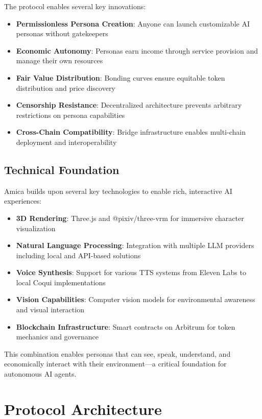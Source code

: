 \documentclass{article}
\begin{document}
The protocol enables several key innovations:

\begin{itemize}
    \item \textbf{Permissionless Persona Creation}: Anyone can launch customizable AI personas without gatekeepers
    \item \textbf{Economic Autonomy}: Personas earn income through service provision and manage their own resources
    \item \textbf{Fair Value Distribution}: Bonding curves ensure equitable token distribution and price discovery
    \item \textbf{Censorship Resistance}: Decentralized architecture prevents arbitrary restrictions on persona capabilities
    \item \textbf{Cross-Chain Compatibility}: Bridge infrastructure enables multi-chain deployment and interoperability
\end{itemize}

\subsection{Technical Foundation}

Amica builds upon several key technologies to enable rich, interactive AI experiences:

\begin{itemize}
    \item \textbf{3D Rendering}: Three.js and @pixiv/three-vrm for immersive character visualization
    \item \textbf{Natural Language Processing}: Integration with multiple LLM providers including local and API-based solutions
    \item \textbf{Voice Synthesis}: Support for various TTS systems from Eleven Labs to local Coqui implementations  
    \item \textbf{Vision Capabilities}: Computer vision models for environmental awareness and visual interaction
    \item \textbf{Blockchain Infrastructure}: Smart contracts on Arbitrum for token mechanics and governance
\end{itemize}

This combination enables personas that can see, speak, understand, and economically interact with their environment—a critical foundation for autonomous AI agents.

\section{Protocol Architecture}
\end{document}
